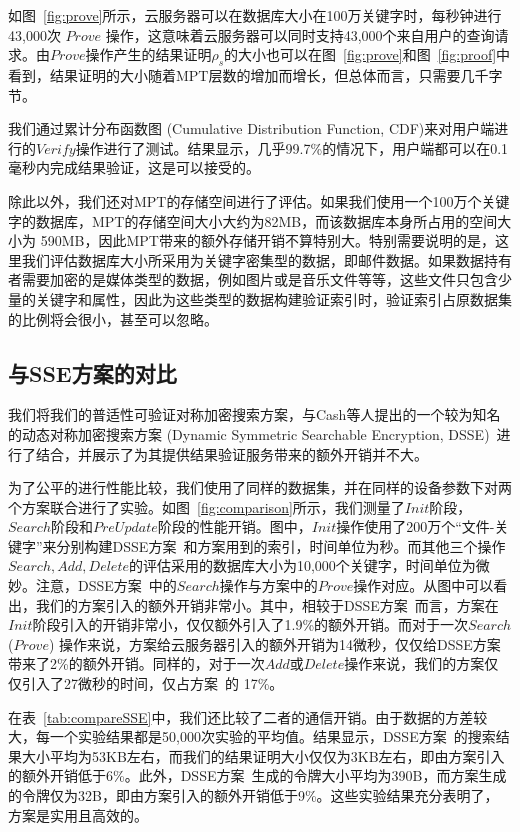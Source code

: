 如图~\ref{fig:prove}所示，云服务器可以在数据库大小在100万关键字时，每秒钟进行43,000次 $Prove$ 操作，这意味着云服务器可以同时支持43,000个来自用户的查询请求。由$Prove$操作产生的结果证明$\rho_s$的大小也可以在图~\ref{fig:prove}和图~\ref{fig:proof}中看到，结果证明的大小随着MPT层数的增加而增长，但总体而言，只需要几千字节。

我们通过累计分布函数图 (Cumulative Distribution Function, CDF)来对用户端进行的$Verify$操作进行了测试。结果显示，几乎99.7\%的情况下，用户端都可以在0.1毫秒内完成结果验证，这是可以接受的。

除此以外，我们还对MPT的存储空间进行了评估。如果我们使用一个100万个关键字的数据库，MPT的存储空间大小大约为82MB，而该数据库本身所占用的空间大小为 590MB，因此MPT带来的额外存储开销不算特别大。特别需要说明的是，这里我们评估数据库大小所采用为关键字密集型的数据，即邮件数据。如果数据持有者需要加密的是媒体类型的数据，例如图片或是音乐文件等等，这些文件只包含少量的关键字和属性，因此为这些类型的数据构建验证索引时，验证索引占原数据集的比例将会很小，甚至可以忽略。



\subsection{与SSE方案的对比}

我们将我们的普适性可验证对称加密搜索方案\single ，与Cash等人提出的一个较为知名的动态对称加密搜索方案 (Dynamic Symmetric Searchable Encryption, DSSE)~\cite{cash2014dynamic}进行了结合，并展示了\single 为其提供结果验证服务带来的额外开销并不大。

为了公平的进行性能比较，我们使用了同样的数据集，并在同样的设备参数下对两个方案联合进行了实验。如图~\ref{fig:comparison}所示，我们测量了$Init$阶段，$Search$阶段和$PreUpdate$阶段的性能开销。图中，$Init$操作使用了200万个“文件-关键字”来分别构建DSSE方案~\cite{cash2014dynamic}和方案\single 用到的索引，时间单位为秒。而其他三个操作$Search, Add, Delete$的评估采用的数据库大小为10,000个关键字，时间单位为微妙。注意，DSSE方案~\cite{cash2014dynamic}中的$Search$操作与\single 方案中的$Prove$操作对应。从图中可以看出，我们的\single 方案引入的额外开销非常小。其中，相较于DSSE方案~\cite{cash2014dynamic}而言，方案\single 在$Init$阶段引入的开销非常小，仅仅额外引入了1.9\%的额外开销。而对于一次$Search$ ($Prove$) 操作来说，\single 方案给云服务器引入的额外开销为14微秒，仅仅给DSSE方案带来了2\%的额外开销。同样的，对于一次$Add$或$Delete$操作来说，我们的\single 方案仅仅引入了27微秒的时间，仅占方案~\cite{cash2014dynamic}的 17\%。

在表~\ref{tab:compareSSE}中，我们还比较了二者的通信开销。由于数据的方差较大，每一个实验结果都是50,000次实验的平均值。结果显示，DSSE方案~\cite{cash2014dynamic}的搜索结果大小平均为53KB左右，而我们的结果证明大小仅仅为3KB左右，即由\single 方案引入的额外开销低于6\%。此外，DSSE方案~\cite{cash2014dynamic}生成的令牌大小平均为390B，而\single 方案生成的令牌仅为32B，即由\single 方案引入的额外开销低于9\%。这些实验结果充分表明了，\single 方案是实用且高效的。



